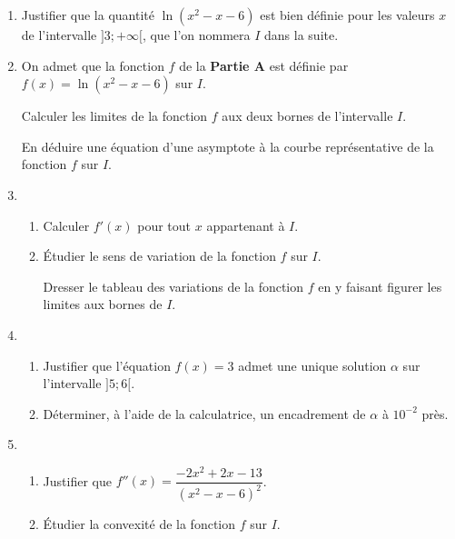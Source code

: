 \begin{enumerate}
	\item Justifier que la quantité $\ln \left(x^2- x- 6\right)$ est bien définie pour les valeurs $x$ de l'intervalle $]3;+\infty[$, que l'on nommera $I$ dans la suite.
	\item On admet que la fonction $f$ de la \textbf{Partie A} est définie par $f(x) = \ln \left(x^2- x- 6\right)$ sur $I$. 
	
	Calculer les limites de la fonction $f$ aux deux bornes de l'intervalle $I$.
	
	En déduire une équation d'une asymptote à la courbe représentative de la fonction $f$ sur $I$.
	\item 
	\begin{enumerate}
		\item Calculer $f'(x)$ pour tout $x$ appartenant à $I$.
		\item Étudier le sens de variation de la fonction $f$ sur $I$.
		
		Dresser le tableau des variations de la fonction $f$ en y faisant figurer les limites aux bornes de $I$.
	\end{enumerate}
	\item 
	\begin{enumerate}
		\item Justifier que l'équation $f(x) = 3$ admet une unique solution $\alpha$ sur l'intervalle $]5;6[$.
		\item Déterminer, à l'aide de la calculatrice, un encadrement de $\alpha$ à $10^{-2}$ près.
	\end{enumerate}
	\item 
	\begin{enumerate}
		\item Justifier que $f''(x) = \dfrac{- 2x^2 + 2x - 13}{\left(x^2 - x - 6\right)^2}$.
		\item Étudier la convexité de la fonction $f$ sur $I$.
	\end{enumerate}
\end{enumerate}

